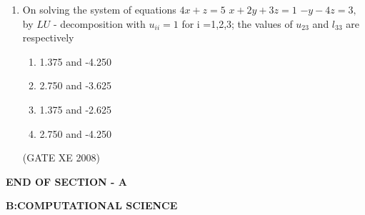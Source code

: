 \documentclass[12pt]{article}
\begin{document}
\begin{enumerate}
\begin{enumerate}
\item  $-kh + \frac{(kh)^2}{2!} -\frac{(kh)^3}{3!}$
\item   $-kh + \frac{(kh)^2}{2} -\frac{(kh)^3}{3}$
\item   $-kh + \frac{(kh)^2}{2} -\frac{(kh)^3}{4}$
\item   $-k(1+\frac{h}{2}-\frac{h^2}{3})$
\end{enumerate}

(GATE XE 2008)
\item  On solving the system of equations\newline
$4x+z =5$\newline
$x+2y+3z =1$\newline
$-y-4z=3,$\newline
by $LU$ - decomposition with $u_{ii} =1$ for i =1,2,3; the values of $u_{23}$ and $l_{33}$ are respectively

\begin{enumerate}
\item  1.375 and -4.250
\item  2.750 and -3.625
\item  1.375 and -2.625
\item 2.750 and -4.250
\end{enumerate}

(GATE XE 2008)\


\end{enumerate}
    
 

\begin{center}
   
    \textbf{END OF SECTION - A}
\end{center}
\newpage
\begin{center}
    \textbf{B:COMPUTATIONAL SCIENCE}
\end{center}
\end{document}

